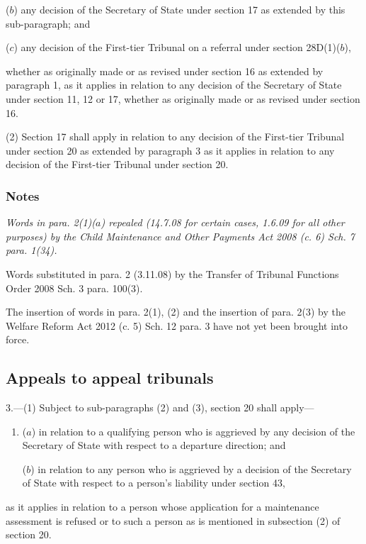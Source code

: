 \documentclass[a4paper]{article}
\newcommand\amendment[1]{\subsubsection*{Notes}{\itshape\frenchspacing\footnotesize #1 \par}}
\begin{document}
{\begin{enumerate}
($b$) any decision of the Secretary of State under section 17 as extended by this sub-paragraph; and

($c$) any decision of the First-tier Tribunal on a referral under section 28D(1)($b$),
\end{enumerate}
whether as originally made or as revised under section 16 as extended by paragraph 1, as it applies in relation to any decision of the Secretary of State under section 11, 12 or 17, whether as originally made or as revised under section 16.

(2) Section 17 shall apply in relation to any decision of the First-tier Tribunal under section 20 as extended by paragraph 3 as it applies in relation to any decision of the First-tier Tribunal under section 20.

\amendment{
Words in para. 2(1)($a$) repealed (14.7.08 for certain cases, 1.6.09 for all other purposes) by the Child Maintenance and Other Payments Act 2008 (c. 6) Sch. 7 para. 1(34).

Words substituted in para. 2 (3.11.08) by the Transfer of Tribunal Functions Order 2008  Sch. 3 para. 100(3).

The insertion of words in para. 2(1), (2) and the insertion of para. 2(3) by the Welfare Reform Act 2012 (c. 5) Sch. 12 para. 3 have not yet been brought into force.

}

\subsection*{Appeals to appeal tribunals}

3.---(1) Subject to sub-paragraphs (2) and (3), section 20 shall apply---
\begin{enumerate}\item[]
($a$) in relation to a qualifying person who is aggrieved by any decision of the Secretary of State with respect to a departure direction; and

($b$) in relation to any person who is aggrieved by a decision of the Secretary of State%
%
{} with respect to a person’s liability under section 43,
\end{enumerate}
as it applies in relation to a person whose application for a maintenance assessment is refused or to such a person as is mentioned in subsection (2) of section 20.

}
\end{document}
